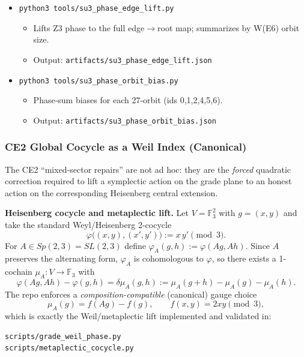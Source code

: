 \documentclass[11pt]{article}
\providecommand{\tightlist}{%
  \setlength{\itemsep}{0pt}\setlength{\parskip}{0pt}}
\begin{document}
\begin{itemize}
  \begin{itemize}
  \tightlist
  \item
    Compares Coxeter‑6 orbit phases to the canonical F3 phase
    assignment.
  \item
    Output: \texttt{artifacts/e8\_coxeter\_phase\_vs\_f3.json}
  \end{itemize}
\item
  \texttt{python3\ tools/su3\_phase\_edge\_lift.py}

  \begin{itemize}
  \tightlist
  \item
    Lifts Z3 phase to the full edge\ensuremath{\rightarrow}root map;
    summarizes by W(E6) orbit size.
  \item
    Output: \texttt{artifacts/su3\_phase\_edge\_lift.json}
  \end{itemize}
\item
  \texttt{python3\ tools/su3\_phase\_orbit\_bias.py}

  \begin{itemize}
  \tightlist
  \item
    Phase‑sum biases for each 27‑orbit (ids 0,1,2,4,5,6).
  \item
    Output: \texttt{artifacts/su3\_phase\_orbit\_bias.json}
  \end{itemize}
\end{itemize}

\subsubsection{CE2 Global Cocycle as a Weil Index (Canonical)}\label{ce2-weil-index}

The CE2 ``mixed-sector repairs'' are not ad hoc: they are the \emph{forced}
quadratic correction required to lift a symplectic action on the grade plane
to an honest action on the corresponding Heisenberg central extension.

\textbf{Heisenberg cocycle and metaplectic lift.} Let $V=\mathbb{F}_3^2$ with
$g=(x,y)$ and take the standard Weyl/Heisenberg 2-cocycle
\[
\varphi\big((x,y),(x',y')\big) := x\,y'\pmod 3.
\]
For $A\in Sp(2,3)=SL(2,3)$ define $\varphi_A(g,h):=\varphi(Ag,Ah)$. Since $A$
preserves the alternating form, $\varphi_A$ is cohomologous to $\varphi$, so
there exists a 1-cochain $\mu_A:V\to\mathbb{F}_3$ with
\[
\varphi(Ag,Ah)-\varphi(g,h)=\delta\mu_A(g,h):=\mu_A(g+h)-\mu_A(g)-\mu_A(h).
\]
The repo enforces a \emph{composition-compatible} (canonical) gauge choice
\[
\mu_A(g)=f(Ag)-f(g),\qquad f(x,y)=2xy\pmod 3,
\]
which is exactly the Weil/metaplectic lift implemented and validated in:
\begin{verbatim}
scripts/grade_weil_phase.py
scripts/metaplectic_cocycle.py
\end{verbatim}
\end{document}
